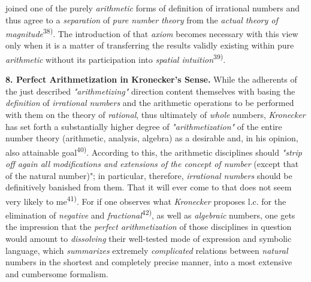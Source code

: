 \thispagestyle{fancy}

\vspace{0.5cm}

joined one of the purely \textit{arithmetic} forms of definition of irrational numbers and thus agree to a \textit{separation} of \textit{pure number theory} from the \textit{actual theory of magnitude}\textsuperscript{38)}. The introduction of that \textit{axiom} becomes necessary with this view only when it is a matter of transferring the results validly existing within pure \textit{arithmetic} without its participation into \textit{spatial intuition}\textsuperscript{39)}.

\vspace{0.5cm}

\textbf{8. Perfect Arithmetization in Kronecker's Sense.} While the adherents of the just described \textit{"arithmetizing"} direction content themselves with basing the \textit{definition} of \textit{irrational numbers} and the arithmetic operations to be performed with them on the theory of \textit{rational}, thus ultimately of \textit{whole} numbers, \textit{Kronecker} has set forth a substantially higher degree of \textit{"arithmetization"} of the entire number theory (arithmetic, analysis, algebra) as a desirable and, in his opinion, also attainable goal\textsuperscript{40)}. According to this, the arithmetic disciplines should \textit{"strip off again all modifications and extensions of the concept of number} (except that of the natural number)"; in particular, therefore, \textit{irrational numbers} should be definitively banished from them. That it will ever come to that does not seem very likely to me\textsuperscript{41)}. For if one observes what \textit{Kronecker} proposes l.c. for the elimination of \textit{negative} and \textit{fractional}\textsuperscript{42)}, as well as \textit{algebraic} numbers, one gets the impression that the \textit{perfect arithmetization} of those disciplines in question would amount to \textit{dissolving} their well-tested mode of expression and symbolic language, which \textit{summarizes} extremely \textit{complicated} relations between \textit{natural} numbers in the shortest and completely precise manner, into a most extensive and cumbersome formalism.

